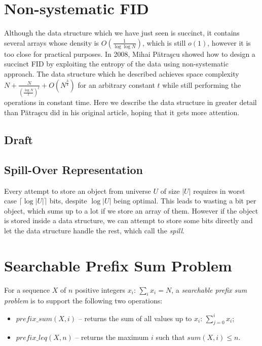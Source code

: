 \section{Non-systematic FID}
	
Although the data structure which we have just seen is succinct, it contains several arrays whose density is $O(\frac{1}{\log \log N})$, which is still $o(1)$, however it is too close for practical purposes.
In 2008, Mihai Pătraşcu showed how to design a succinct FID by exploiting the entropy of the data using non-systematic approach.
The data structure which he described achieves space complexity $N + \frac{N}{\left(\frac{\log N}{t}\right)^t} + O(N^\frac{3}{4})$ for an arbitrary constant $t$ while still performing the operations in constant time.
Here we describe the data structure in greater detail than Pătraşcu did in his original article, hoping that it gets more attention.

\subsection{Draft}



\subsection{Spill-Over Representation}

Every attempt to store an object from universe $U$ of size $|U|$ requires in worst case $\lceil \log |U| \rceil$ bits, despite $\log |U|$ being optimal.
This leads to wasting a bit per object, which sums up to a lot if we store an array of them.
However if the object is stored inside a data structure, we can attempt to store some bits directly and let the data structure handle the rest, which call the \emph{spill}.

\section{Searchable Prefix Sum Problem}


For a sequence $X$ of $n$ positive integers $x_i$: $\sum_i x_i = N$, a \emph{searchable prefix sum problem} is to support the following two operations:
\begin{itemize}
	\item $prefix\_sum(X, i)$ -- returns the sum of all values up to $x_i$: $\sum_{j=0}^i x_i$;
	\item $prefix\_leq(X, n)$ -- returns the maximum $i$ such that $sum(X, i) \le n$.
\end{itemize}

